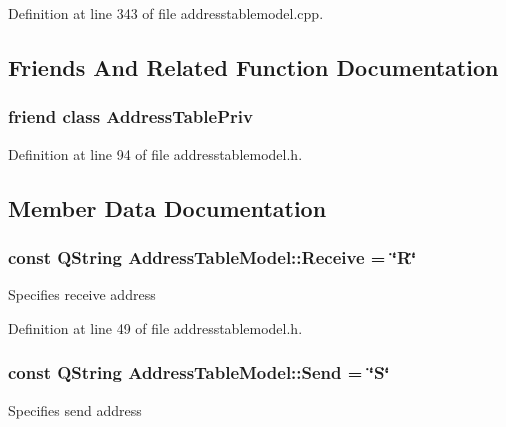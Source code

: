 Definition at line 343 of file addresstablemodel.\+cpp.



\subsection{Friends And Related Function Documentation}
\hypertarget{class_address_table_model_aa3f1055879193511b3a0088db8c1d9ec}{}
\subsubsection[{Address\+Table\+Priv}]{\setlength{\rightskip}{0pt plus 5cm}friend class {\bf Address\+Table\+Priv}\hspace{0.3cm}{\ttfamily [friend]}}\label{class_address_table_model_aa3f1055879193511b3a0088db8c1d9ec}


Definition at line 94 of file addresstablemodel.\+h.



\subsection{Member Data Documentation}
\hypertarget{class_address_table_model_acaed83193545456eab47dd7be1d2ceba}{}
\subsubsection[{Receive}]{\setlength{\rightskip}{0pt plus 5cm}const Q\+String Address\+Table\+Model\+::\+Receive = \char`\"{}R\char`\"{}\hspace{0.3cm}{\ttfamily [static]}}\label{class_address_table_model_acaed83193545456eab47dd7be1d2ceba}
Specifies receive address 

Definition at line 49 of file addresstablemodel.\+h.

\hypertarget{class_address_table_model_a7c74e158d014a757c2edcc5bcb1e9a62}{}
\subsubsection[{Send}]{\setlength{\rightskip}{0pt plus 5cm}const Q\+String Address\+Table\+Model\+::\+Send = \char`\"{}S\char`\"{}\hspace{0.3cm}{\ttfamily [static]}}\label{class_address_table_model_a7c74e158d014a757c2edcc5bcb1e9a62}
Specifies send address 

